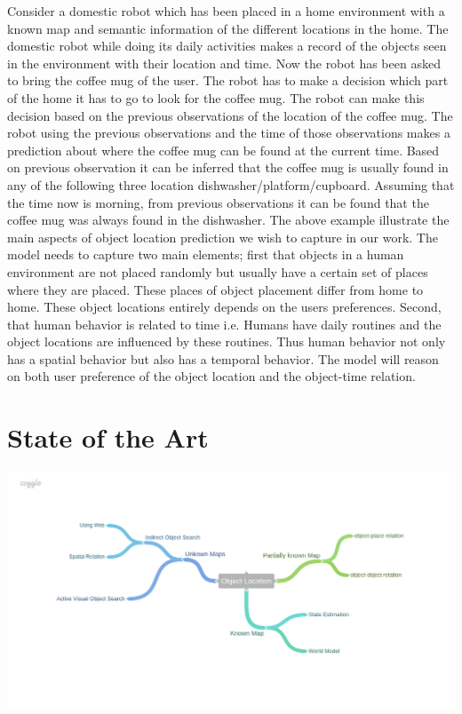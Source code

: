 \documentclass{llncs}
\begin{document}
Consider a domestic robot which has been placed in a home environment with a
known map and semantic information of the different locations in the home. The domestic
robot while doing its daily activities makes a record of the objects seen in the environment
with their location and time. Now the robot has been asked to bring the coffee mug of the
user. The robot has to make a decision which part of the home it has to go to look for the
coffee mug. The robot can make this decision based on the previous observations of the
location of the coffee mug. The robot using the previous observations and the time of those
observations makes a prediction about where the coffee mug can be found at the current
time. Based on previous observation it can be inferred that the coffee mug is usually found
in any of the following three location dishwasher/platform/cupboard. Assuming that the
time now is morning, from previous observations it can be found that the coffee mug was
always found in the dishwasher. The above example illustrate the main aspects of object
location prediction we wish to capture in our work.
The model needs to capture two main elements; first that objects in a human environment are not placed randomly but usually have a certain set of places where they are
placed. These places of object placement differ from home to home. These object locations entirely depends on the users preferences. Second, that human behavior is related
to time i.e. Humans have daily routines and the object locations are influenced by these
routines. Thus human behavior not only has a spatial behavior but also has a temporal
behavior. The model will reason on both user preference of the object location and the
object-time relation.

%
\section{State of the Art}
\includegraphics[width=\textwidth]{Object_Location.png}
\end{document}
